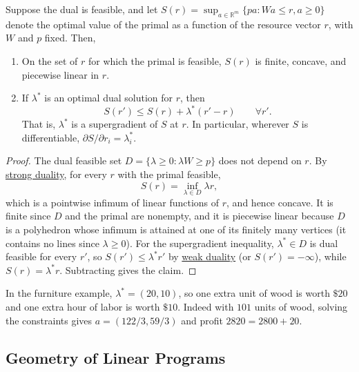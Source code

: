 	\begin{theorem}
	  \label{thm:dual-variables-are-maringal-shadow-prices}
		Suppose the dual is feasible, and let $S(r) = \sup_{a \in \mathbb{R}^m} \{pa \colon Wa \leq r, a \geq 0 \}$ denote the optimal value of the primal as a function of the resource vector $r$, with $W$ and $p$ fixed. Then, 
		\begin{enumerate}
		  \item On the set of $r$ for which the primal is feasible, $S(r)$ is finite, concave, and piecewise linear in $r$. 
			\item If $\lambda^\ast$ is an optimal dual solution for $r$, then 
				\begin{equation}
					S(r') \leq S(r) + \lambda^\ast (r' - r) \qquad \forall r'.
				\end{equation}
				That is, $\lambda^\ast$ is a supergradient of $S$ at $r$. In particular, wherever $S$ is differentiable, $\partial S / \partial r_i = \lambda^\ast_i$. 
		\end{enumerate}
	\end{theorem}
	\begin{proof}
		The dual feasible set $D = \{\lambda \geq 0 \colon \lambda W \geq p\}$ does not depend on $r$. By \hyperref[thm:strong-duality]{strong duality}, for every $r$ with the primal feasible, 
		\begin{equation}
			S(r) = \inf_{\lambda \in D} \lambda r,
		\end{equation}
		which is a pointwise infimum of linear functions of $r$, and hence concave. It is finite since $D$ and the primal are nonempty, and it is piecewise linear because $D$ is a polyhedron whose infimum is attained at one of its finitely many vertices (it contains no lines since $\lambda \geq 0$). For the supergradient inequality, $\lambda^\ast \in D$ is dual feasible for every $r'$, so $S(r') \leq \lambda^\ast r'$ by \hyperref[thm:weak-duality]{weak duality} (or $S(r') = -\infty$), while $S(r) = \lambda^\ast r$. Subtracting gives the claim. 
	\end{proof}

	In the furniture example, $\lambda^\ast = (20, 10)$, so one extra unit of wood is worth $\$20$ and one extra hour of labor is worth $\$10$. Indeed with $101$ units of wood, solving the constraints gives $a = (122/3, 59/3)$ and profit $2820 = 2800 + 20$. 

\subsection{Geometry of Linear Programs}

